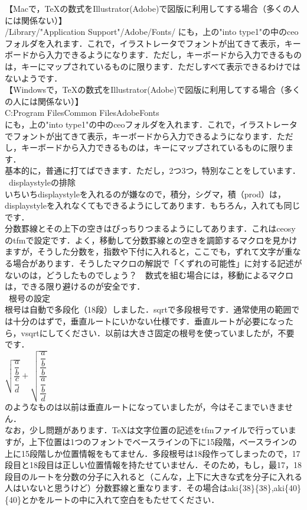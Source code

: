 \documentclass [10pt,fleqn,b5paper]{jsarticlek}
\begin{document}
【Macで，TeXの数式をIllustrator(Adobe)で図版に利用してする場合（多くの人には関係ない）】\\
 /Library/"Application Support"/Adobe/Fonts/ 
にも，上の"into type1"の中のceoフォルダを入れます．これで，イラストレータでフォントが出てきて表示，キーボードから入力できるようになります．ただし，キーボードから入力できるものは，キーにマップされているものに限ります．ただしすべて表示できるわけではないようです．\\

【Windowsで，TeXの数式をIllustrator(Adobe)で図版に利用してする場合（多くの人には関係ない）】\\
C:\yy Program Files\yy Common Files\yy Adobe\yy Fonts\\
にも，上の"into type1"の中のceoフォルダを入れます．これで，イラストレータでフォントが出てきて表示，キーボードから入力できるようになります．ただし，キーボードから入力できるものは，キーにマップされているものに限ります．\\



\newpage
{}
 基本的に，普通に打てばできます．ただし，2つ3つ，特別なことをしています．\\
\kakkoichi \, displaystyleの排除\\
 いちいちdisplaystyleを入れるのが嫌なので，積分，シグマ，積（prod）は，displaystyleを入れなくてもできるようにしてあります．もちろん，入れても同じです．\\
 分数罫線とその上下の空きはぴっちりつまるようにしてあります．これはceosyのtfmで設定です．よく，移動して分数罫線との空きを調節するマクロを見かけますが，そうした分数を，指数や下付に入れると，ここでも，ずれて文字が重なる場合があります．そうしたマクロの解説で「くずれの可能性」に対する記述がないのは，どうしたものでしょう？　数式を組む場合には，移動によるマクロは，できる限り避けるのが安全です．\\
\kakkoni \, 根号の設定\\
 根号は自動で多段化（18段）しました．sqrtで多段根号です．通常使用の範囲では十分のはずで，垂直ルートにいかない仕様です．垂直ルートが必要になったら，vsqrtにしてください．以前は大きさ固定の根号を使っていましたが，不要です．\\
$\sqrt{\dfrac{\dfrac{a}{b}}{\dfrac{c}{d}}}+\sqrt{\dfrac{\dfrac{\dfrac{a}{b}}{b}}{\dfrac{\dfrac{a}{b}}{d}}}$\\
のようなものは以前は垂直ルートになっていましたが，今はそこまでいきません．\\
なお，少し問題があります．TeXは文字位置の記述をtfmファイルで行っていますが，上下位置は1つのフォントでベースラインの下に15段階，ベースラインの上に15段階しか位置情報をもてません．多段根号は18段作ってしまったので，17段目と18段目は正しい位置情報を持たせていません．そのため，もし，最17，18段目のルートを分数の分子に入れると（こんな，上下に大きな式を分子に入れる人はいないと思うけど）分数罫線と重なります．その場合は\yy aki\{38\}\{38\},\yy aki\{40\}\{40\}とかをルートの中に入れて空白をもたせてください．\\
\end{document}
